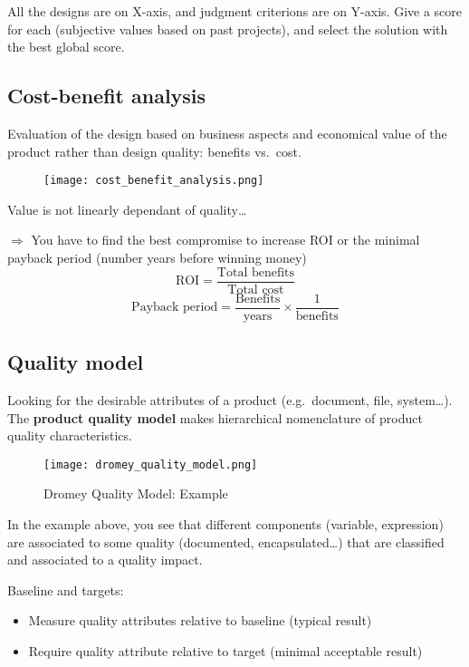All the designs are on X-axis, and judgment criterions are on Y-axis. 
Give a score for each (subjective values based on past projects), and
select the solution with the best global score.

\subsection{Cost-benefit analysis}

Evaluation of the design based on business aspects and economical value
of the product rather than design quality: benefits vs.\ cost.

\begin{figure}[!ht]
    \centering
    \texttt{[image: cost\_benefit\_analysis.png]}
\end{figure}

Value is not linearly dependant of quality\ldots

$\Rightarrow$ You have to find the best compromise to increase ROI
or the minimal payback period (number years before winning money)
$$ \text{ROI} = \frac{\text{Total benefits}}{\text{Total cost}}$$
$$\text{Payback period} = \frac{\text{Benefits}}{\text{years}} \times
\frac{1}{\text{benefits}}$$

\subsection{Quality model}

Looking for the desirable attributes of a product (e.g.\ document, file,
system\ldots).
The \textbf{product quality model} makes hierarchical nomenclature of product quality characteristics. 
\newline

\begin{figure}[!ht]
    \centering
    \texttt{[image: dromey\_quality\_model.png]}
    \caption{Dromey Quality Model: Example}
\end{figure}

In the example above, you see that different components (variable,
expression) are associated to some quality (documented,
encapsulated\ldots) that are classified and associated to a quality
impact. 

Baseline and targets:
\begin{itemize}
    \item Measure quality attributes relative to baseline (typical result)
    \item Require quality attribute relative to target (minimal acceptable result)
\end{itemize}
